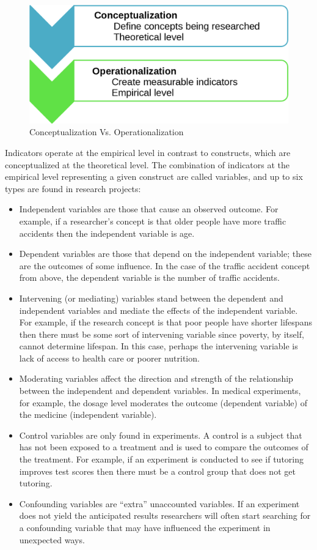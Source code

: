 \begin{figure}[H]
	\centering
	\includegraphics[width=\maxwidth{.95\linewidth}]{gfx/05-ConceptVsOper}
	\caption{Conceptualization Vs. Operationalization}
	\label{05:fig02}
\end{figure}

Indicators operate at the empirical level in contrast to constructs, which are conceptualized at the theoretical level. The combination of indicators at the empirical level representing a given construct are called \glspl{variable}, and up to six types are found in research projects:

\begin{itemize}
	\item Independent variables are those that cause an observed outcome. For example, if a researcher's concept is that older people have more traffic accidents then the independent variable is age.
	\item Dependent variables are those that depend on the independent variable; these are the outcomes of some influence. In the case of the traffic accident concept from above, the dependent variable is the number of traffic accidents.
	\item Intervening (or mediating) variables stand between the dependent and independent variables and mediate the effects of the independent variable. For example, if the research concept is that poor people have shorter lifespans then there must be some sort of intervening variable since poverty, by itself, cannot determine lifespan. In this case, perhaps the intervening variable is lack of access to health care or poorer nutrition.
	\item Moderating variables affect the direction and strength of the relationship between the independent and dependent variables. In medical experiments, for example, the dosage level moderates the outcome (dependent variable) of the medicine (independent variable). 
	\item Control variables are only found in experiments. A control is a subject that has not been exposed to a treatment and is used to compare the outcomes of the treatment. For example, if an experiment is conducted to see if tutoring improves test scores then there must be a control group that does not get tutoring.
	\item Confounding variables are ``extra'' unaccounted variables. If an experiment does not yield the anticipated results researchers will often start searching for a confounding variable that may have influenced the experiment in unexpected ways.
\end{itemize}

